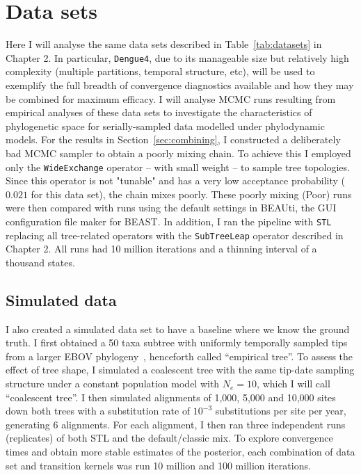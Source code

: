 \section{Data sets}
\label{sec:data}

Here I will analyse the same data sets described in Table~\ref{tab:datasets} in Chapter 2.
In particular, \verb|Dengue4|, due to its manageable size but relatively high complexity (multiple partitions, temporal structure, etc), will be used to exemplify the full breadth of convergence diagnostics available and how they may be combined for maximum efficacy.
I will analyse MCMC runs resulting from empirical analyses of these data sets to investigate the characteristics of phylogenetic space for serially-sampled data modelled under phylodynamic models.
For the results in Section~\ref{sec:combining}, I constructed a deliberately bad MCMC sampler to obtain a poorly mixing chain.
To achieve this I employed only the \verb|WideExchange| operator  -- with small weight -- to sample tree topologies.
Since this operator is not "tunable" and has a very low acceptance probability ($0.021$ for this data set), the chain mixes poorly.
These poorly mixing (Poor) runs were then compared with runs using the default settings in BEAUti, the GUI configuration file maker for BEAST.
In addition, I ran the pipeline with \verb|STL| replacing all tree-related operators with the \verb|SubTreeLeap| operator described in Chapter 2.
All runs had 10 million iterations and a thinning interval of a thousand states. 

\subsection{Simulated data}
\label{sec:simudata}

I also created a simulated data set to have a baseline where we know the ground truth.
I first obtained a 50 taxa subtree with uniformly temporally sampled tips from a larger EBOV phylogeny~\citep{Dudas2017}, henceforth called ``empirical tree''.
To assess the effect of tree shape, I simulated a coalescent tree with the same tip-date sampling structure under a constant population model with $N_e = 10$, which I will call ``coalescent tree''.
I then simulated alignments of 1,000, 5,000 and 10,000 sites down both trees with a substitution rate of $10^{-3}$ substitutions per site per year, generating 6 alignments.
For each alignment, I then ran three independent runs (replicates) of both STL and the default/classic mix.
To explore convergence times and obtain more stable estimates of the posterior, each combination of data set and transition kernels was run 10 million and 100 million iterations.

